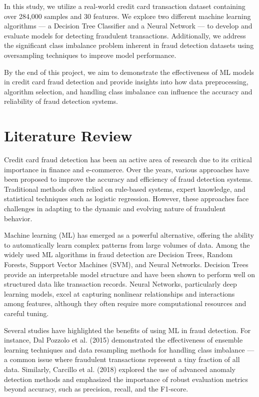 \documentclass[11pt]{article}
\begin{document}
In this study, we utilize a real-world credit card transaction dataset containing over 284,000 samples and 30 features. We explore two different machine learning algorithms — a Decision Tree Classifier and a Neural Network — to develop and evaluate models for detecting fraudulent transactions. Additionally, we address the significant class imbalance problem inherent in fraud detection datasets using oversampling techniques to improve model performance.

By the end of this project, we aim to demonstrate the effectiveness of ML models in credit card fraud detection and provide insights into how data preprocessing, algorithm selection, and handling class imbalance can influence the accuracy and reliability of fraud detection systems.

\section{Literature Review}
Credit card fraud detection has been an active area of research due to its critical importance in finance and e-commerce. Over the years, various approaches have been proposed to improve the accuracy and efficiency of fraud detection systems. Traditional methods often relied on rule-based systems, expert knowledge, and statistical techniques such as logistic regression. However, these approaches face challenges in adapting to the dynamic and evolving nature of fraudulent behavior.

Machine learning (ML) has emerged as a powerful alternative, offering the ability to automatically learn complex patterns from large volumes of data. Among the widely used ML algorithms in fraud detection are Decision Trees, Random Forests, Support Vector Machines (SVM), and Neural Networks. Decision Trees provide an interpretable model structure and have been shown to perform well on structured data like transaction records. Neural Networks, particularly deep learning models, excel at capturing nonlinear relationships and interactions among features, although they often require more computational resources and careful tuning.

Several studies have highlighted the benefits of using ML in fraud detection. For instance, Dal Pozzolo et al. (2015) \cite{Pozzolo} demonstrated the effectiveness of ensemble learning techniques and data resampling methods for handling class imbalance — a common issue where fraudulent transactions represent a tiny fraction of all data. Similarly, Carcillo et al. (2018) \cite{Carcillo} explored the use of advanced anomaly detection methods and emphasized the importance of robust evaluation metrics beyond accuracy, such as precision, recall, and the F1-score.
\end{document}
